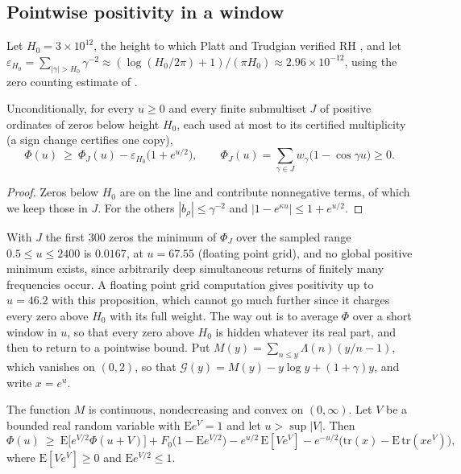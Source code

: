 \subsection{Pointwise positivity in a window}
Let $H_0=3\times10^{12}$, the height to which Platt and Trudgian verified RH \cite{PT21}, and let $\varepsilon_{H_0}=\sum_{|\gamma|>H_0}\gamma^{-2}\approx(\log(H_0/2\pi)+1)/(\pi H_0)\approx2.96\times10^{-12}$, using the zero counting estimate of \cite{HSW22}.
\begin{proposition}\label{st:prop:window}
Unconditionally, for every $u\ge0$ and every finite submultiset $J$ of positive ordinates of zeros below height $H_0$, each used at most to its certified multiplicity (a sign change certifies one copy),
\[
\Phi(u)\ \ge\ \Phi_J(u)-\varepsilon_{H_0}\big(1+e^{u/2}\big),\qquad \Phi_J(u)=\sum_{\gamma\in J}w_\gamma\big(1-\cos\gamma u\big)\ge0 .
\]
\end{proposition}
\begin{proof}
Zeros below $H_0$ are on the line and contribute nonnegative terms, of which we keep those in $J$. For the others $|b_\rho|\le\gamma^{-2}$ and $|1-e^{\kappa u}|\le1+e^{u/2}$.
\end{proof}
With $J$ the first 300 zeros the minimum of $\Phi_J$ over the sampled range $0.5\le u\le2400$ is $0.0167$, at $u=67.55$ (floating point grid), and no global positive minimum exists, since arbitrarily deep simultaneous returns of finitely many frequencies occur. A floating point grid computation gives positivity up to $u=46.2$ with this proposition, which cannot go much further since it charges every zero above $H_0$ with its full weight. The way out is to average $\Phi$ over a short window in $u$, so that every zero above $H_0$ is hidden whatever its real part, and then to return to a pointwise bound. Put $M(y)=\sum_{n\le y}\Lambda(n)(y/n-1)$, which vanishes on $(0,2)$, so that $\mathcal G(y)=M(y)-y\log y+(1+\gamma)y$, and write $x=e^u$.
\begin{lemma}\label{st:lem:upgrade}
The function $M$ is continuous, nondecreasing and convex on $(0,\infty)$. Let $V$ be a bounded real random variable with $\mathrm Ee^V=1$ and let $u>\sup|V|$. Then
\[
\Phi(u)\ \ge\ \mathrm E\big[e^{V/2}\Phi(u+V)\big]+F_0\big(1-\mathrm Ee^{V/2}\big)-e^{u/2}\,\mathrm E[Ve^V]-e^{-u/2}\big(\mathrm{tr}(x)-\mathrm E\,\mathrm{tr}(xe^V)\big),
\]
where $\mathrm E[Ve^V]\ge0$ and $\mathrm Ee^{V/2}\le1$.
\end{lemma}
